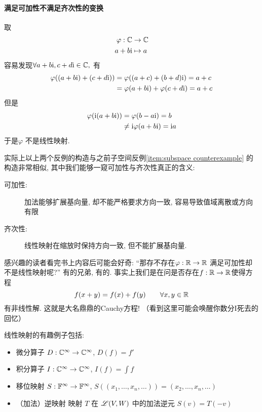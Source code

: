 \paragraph{满足可加性不满足齐次性的变换}
取
\begin{align*}
    \varphi: \mathbb{C} &\to \mathbb{C} \\
    a+b \mathrm{i} &\mapsto a
\end{align*}
容易发现\(\forall a+b\mathrm{i},c+d\mathrm{i} \in \mathbb{C},\) 有
\begin{align*}
    \varphi((a+b\mathrm{i})+(c+d\mathrm{i})) &= \varphi((a+c)+(b+d)\mathrm{i}) = a+c \\
    &=\varphi(a+b\mathrm{i}) + \varphi(c+d\mathrm{i}) =a+c
\end{align*}
但是
\begin{align*}
    \varphi(\mathrm{i}(a+b\mathrm{i})) &= \varphi(b-a\mathrm{i}) = b \\
    &\neq \mathrm{i}\varphi(a+b\mathrm{i}) =\mathrm{i} a
\end{align*}
于是\(\varphi\) 不是线性映射.

实际上以上两个反例的构造与之前子空间反例\ref{item:subspace
counterexample}
的构造非常相似, 其中我们能够一窥可加性与齐次性真正的含义:
\begin{description}
    \item[可加性:] 加法能够扩展基向量, 却不能严格要求方向一致, 容易导致值域离散或方向有限
    \item[齐次性:] 线性映射在缩放时保持方向一致, 但不能扩展基向量.
\end{description}

感兴趣的读者看完书上内容后可能会好奇: ``那存不存在\(\varphi: \mathbb{R} \to
\mathbb{R}\) 满足可加性却不是线性映射呢?'' 有的兄弟, 有的.
事实上我们是在问是否存在\(f:\mathbb{R} \to \mathbb{R}\)使得方程
\[
    f(x+y) = f(x) + f(y) \qquad \forall x,y \in \mathbb{R}
\]
有非线性解. 这就是大名鼎鼎的Cauchy方程! （看到这里可能会唤醒你数分I死去的回忆）

线性映射的有趣例子包括:
\begin{itemize}
    \item 微分算子 \(D: \mathbb{C}^{\infty} \to
        \mathbb{C}^{\infty}\), \(D(f) = f'\)
    \item 积分算子 \(I: \mathbb{C}^{\infty} \to
        \mathbb{C}^{\infty}\), \(I(f) = \int f\)
    \item 移位映射 \(S: \mathbb{F}^{\infty} \to \mathbb{F}^{\infty}\),
        \(S((x_{1},\dots, x_{n}, \dots)) = (x_{2},\dots,
        x_{n}, \dots)\)
    \item （加法）逆映射 映射 \(T\) 在 \(\mathscr{L}(V,W)\) 中的加法逆元
        \(S(v)=T(-v)\)
\end{itemize}
